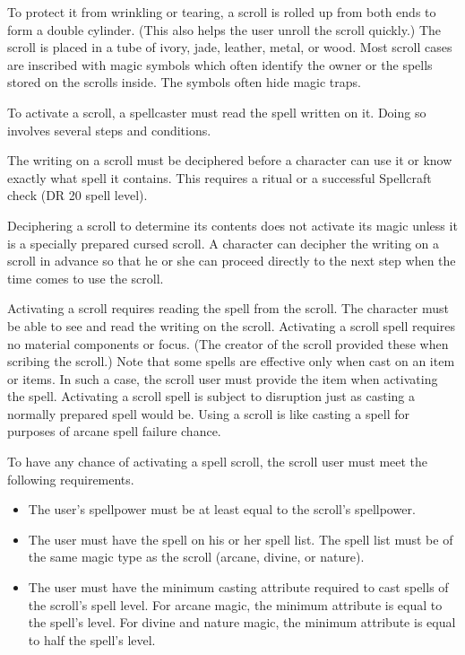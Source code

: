 To protect it from wrinkling or tearing, a scroll is rolled up from both ends to form a double cylinder.
(This also helps the user unroll the scroll quickly.) The scroll is placed in a tube of ivory, jade, leather, metal, or wood.
Most scroll cases are inscribed with magic symbols which often identify the owner or the spells stored on the scrolls inside.
The symbols often hide magic traps.

 To activate a scroll, a spellcaster must read the spell written on it.
Doing so involves several steps and conditions.

 The writing on a scroll must be deciphered before a character can use it or know exactly what spell it contains.
This requires a  ritual or a successful Spellcraft check (DR 20 \add spell level).

Deciphering a scroll to determine its contents does not activate its magic unless it is a specially prepared cursed scroll.
A character can decipher the writing on a scroll in advance so that he or she can proceed directly to the next step when the time comes to use the scroll.

 Activating a scroll requires reading the spell from the scroll.
The character must be able to see and read the writing on the scroll.
Activating a scroll spell requires no material components or focus.
(The creator of the scroll provided these when scribing the scroll.) Note that some spells are effective only when cast on an item or items.
In such a case, the scroll user must provide the item when activating the spell.
Activating a scroll spell is subject to disruption just as casting a normally prepared spell would be.
Using a scroll is like casting a spell for purposes of arcane spell failure chance.

To have any chance of activating a spell scroll, the scroll user must meet the following requirements.
\begin{itemize}
    \item The user's spellpower must be at least equal to the scroll's spellpower.
    \item The user must have the spell on his or her spell list.
        The spell list must be of the same magic type as the scroll (arcane, divine, or nature).
    \item The user must have the minimum casting attribute required to cast spells of the scroll's spell level.
        For arcane magic, the minimum attribute is equal to the spell's level.
        For divine and nature magic, the minimum attribute is equal to half the spell's level.
\end{itemize}

